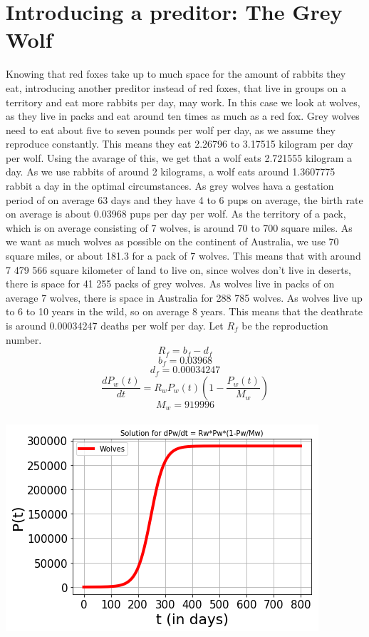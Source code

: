 \documentclass{article}
\begin{document}
\section{Introducing a preditor: The Grey Wolf}
Knowing that red foxes take up to much space for the amount of rabbits they eat, introducing another preditor instead of red foxes, that live in groups on a territory and eat more rabbits per day, may work. In this case we look at wolves, as they live in packs and eat around ten times as much as a red fox. Grey wolves need to eat about five to seven pounds per wolf per day, as we assume they reproduce constantly. This means they eat 2.26796 to 3.17515 kilogram per day per wolf. Using the avarage of this, we get that a wolf eats 2.721555 kilogram a day. As we use rabbits of around 2 kilograms, a wolf eats around 1.3607775 rabbit a day in the optimal circumstances. As grey wolves hava a gestation period of on average 63 days  and they have 4 to 6 pups on average, the birth rate on average is about 0.03968 pups per day per wolf. As the territory of a pack, which is on average consisting of 7 wolves, is around 70 to 700 square miles. As we want as much wolves as possible on the continent of Australia, we use 70 square miles, or about 181.3 for a pack of 7 wolves. This means that with around 7 479 566 square kilometer of land to live on, since wolves don't live in deserts, there is space for 41 255 packs of grey wolves. As wolves live in packs of on average 7 wolves, there is space in Australia for 288 785 wolves. As wolves live up to 6 to 10 years in the wild, so on average 8 years. This means that the deathrate is around 0.00034247 deaths per wolf per day. 
Let $R_f$ be the reproduction number.
$$R_f = b_f - d_f$$
$$b_f = 0.03968$$
$$d_f = 0.00034247$$
$$\frac{dP_w(t)}{dt} = R_wP_w(t)(1-\frac{P_w(t)}{M_w})$$
$$M_w = 919996$$
\\
\includegraphics[scale=0.78]{Pictures/Wolves.png}
\end{document}
